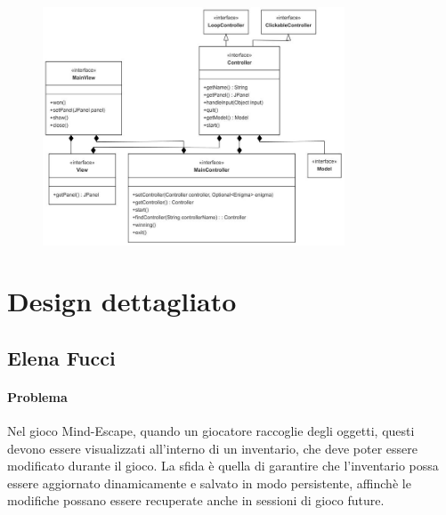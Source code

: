 \documentclass[a4paper,12pt]{report}
\begin{document}
\begin{figure}   %
    \centering
    \includegraphics[width=0.8\textwidth]{img/mvc.png}  %
    \label{img:mvc}
\end{figure}

\section{Design dettagliato}
\subsection{Elena Fucci}
%
\paragraph{Problema}Nel gioco Mind-Escape, quando un giocatore raccoglie degli oggetti, questi devono essere visualizzati all'interno di un inventario, che deve poter essere modificato durante il gioco.
La sfida è quella di garantire che l'inventario possa essere aggiornato dinamicamente e salvato in modo persistente, affinchè le modifiche possano essere recuperate anche in sessioni di gioco future. %
\end{document}
